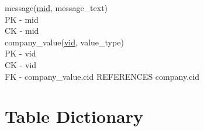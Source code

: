 \documentclass[11pt]{report}
\begin{document}
message(\underline{mid}, message\_text) \\
PK - mid \\
CK - mid \\

company\_value(\underline{vid}, value\_type) \\
PK - vid \\
CK - vid \\
FK - company\_value.cid REFERENCES company.cid
\clearpage
\section{Table Dictionary}
\begin{table}[h]
\centering
{}
\end{table}
\end{document}
